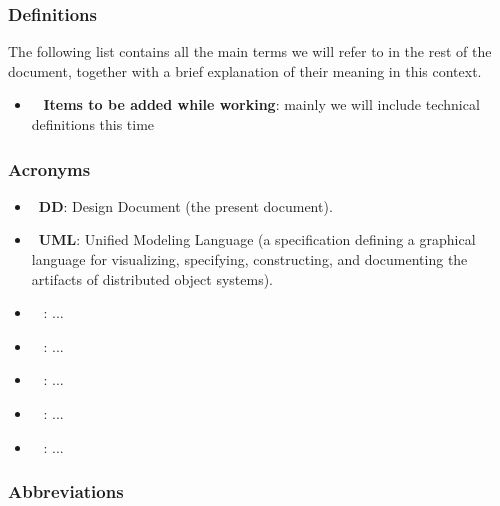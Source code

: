 \subsubsection{Definitions}

The following list contains all the main terms we will refer to in the rest of the document, together with a brief explanation of their meaning in this context.

\begin{itemize}
\item~ \textbf{Items to be added while working}: mainly we will include technical definitions this time
\end{itemize}

\subsubsection{Acronyms}

\begin{itemize}
\item~\textbf{DD}: Design Document (the present document).
\item~\textbf{UML}: Unified Modeling Language (a specification defining a graphical language for visualizing, specifying, constructing, and documenting the artifacts of distributed object systems).
\item~ : ...
\item~ : ...
\item~ : ...
\item~ : ...
\item~ : ...
\end{itemize}

\subsubsection{Abbreviations}

